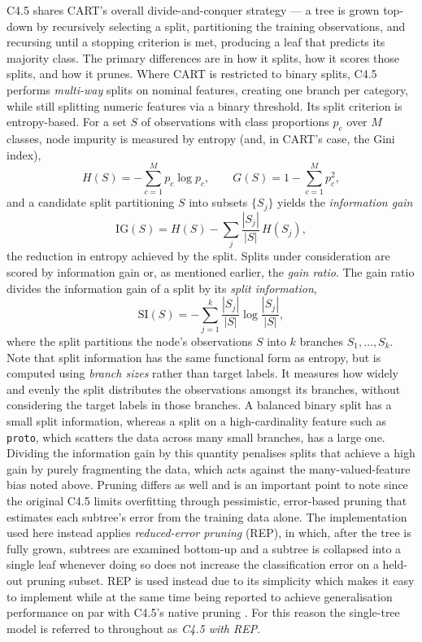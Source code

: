 \documentclass[conference]{IEEEtran}
\begin{document}
C4.5 shares CART's overall divide-and-conquer strategy --- a tree is grown top-down by
recursively selecting a split, partitioning the training observations, and recursing
until a stopping criterion is met, producing a leaf that predicts its majority class. The primary differences are
in how it splits, how it scores those splits, and how it prunes. Where CART is restricted
to binary splits, C4.5 performs \emph{multi-way} splits on nominal features, creating one
branch per category, while still splitting numeric features via a binary
threshold. 
Its split criterion is entropy-based. For a set $S$ of observations with class
proportions $p_c$ over $M$ classes, node impurity is measured by entropy (and, in CART's
case, the Gini index),
\begin{equation}
H(S) = -\sum_{c=1}^{M} p_c \log p_c,
\qquad
G(S) = 1 - \sum_{c=1}^{M} p_c^2 ,
\end{equation}
and a candidate split partitioning $S$ into subsets $\{S_j\}$ yields the \emph{information
gain}
\begin{equation}
\mathrm{IG}(S) = H(S) - \sum_j \frac{|S_j|}{|S|}\, H(S_j),
\end{equation}
the reduction in entropy achieved by the split. Splits under consideration are scored by
information gain or, as mentioned earlier, the \emph{gain ratio}. The gain ratio divides
the information gain of a split by its \emph{split information},
\begin{equation}
\mathrm{SI}(S) = -\sum_{j=1}^{k} \frac{|S_j|}{|S|} \log \frac{|S_j|}{|S|},
\end{equation}
where the split partitions the node's observations $S$ into $k$ branches
$S_1,\dots,S_k$. Note that split information has the same functional form as entropy, but is
computed using \emph{branch sizes} rather than target labels. 
It measures how widely and evenly the split distributes the observations amongst its branches,
without considering the target labels in those branches. A balanced binary split has a small
split information, whereas a split on a high-cardinality feature such as \texttt{proto},
which scatters the data across many small branches, has a large one. Dividing the
information gain by this quantity penalises splits that achieve a high gain by purely fragmenting
the data, which acts against the many-valued-feature bias noted above. 
Pruning differs as well and is an important point to note since the original
C4.5 limits overfitting through pessimistic, error-based pruning that estimates each
subtree's error from the training data alone. The implementation used here instead applies
\emph{reduced-error pruning} (REP), in which, after the tree is fully grown, subtrees are
examined bottom-up and a subtree is collapsed into a single leaf whenever doing so does not
increase the classification error on a held-out pruning subset. REP is used instead due to its
simplicity which makes it easy to implement while at the same time being
reported to achieve generalisation performance on par with
C4.5's native pruning \cite{esposito1997}. For this reason the single-tree model is referred to
throughout as \emph{C4.5 with REP}.
\end{document}
